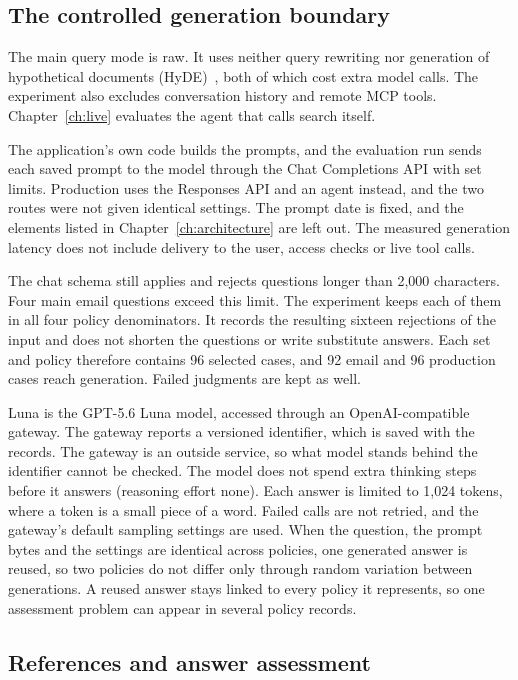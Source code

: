 \subsection{The controlled generation boundary}

The main query mode is raw. It uses neither query rewriting nor generation of hypothetical documents (HyDE)~\cite{gao2023hyde}, both of which cost extra model calls. The experiment also excludes conversation history and remote MCP tools. Chapter~\ref{ch:live} evaluates the agent that calls search itself.

The application's own code builds the prompts, and the evaluation run sends each saved prompt to the model through the Chat Completions API with set limits. Production uses the Responses API and an agent instead, and the two routes were not given identical settings. The prompt date is fixed, and the elements listed in Chapter~\ref{ch:architecture} are left out. The measured generation latency does not include delivery to the user, access checks or live tool calls.

The chat schema still applies and rejects questions longer than 2,000 characters. Four main email questions exceed this limit. The experiment keeps each of them in all four policy denominators. It records the resulting sixteen rejections of the input and does not shorten the questions or write substitute answers. Each set and policy therefore contains 96 selected cases, and 92 email and 96 production cases reach generation. Failed judgments are kept as well.

Luna is the GPT-5.6 Luna model, accessed through an OpenAI-compatible gateway. The gateway reports a versioned identifier, which is saved with the records. The gateway is an outside service, so what model stands behind the identifier cannot be checked. The model does not spend extra thinking steps before it answers (reasoning effort none). Each answer is limited to 1,024 tokens, where a token is a small piece of a word. Failed calls are not retried, and the gateway's default sampling settings are used. When the question, the prompt bytes and the settings are identical across policies, one generated answer is reused, so two policies do not differ only through random variation between generations. A reused answer stays linked to every policy it represents, so one assessment problem can appear in several policy records.

\subsection{References and answer assessment}

